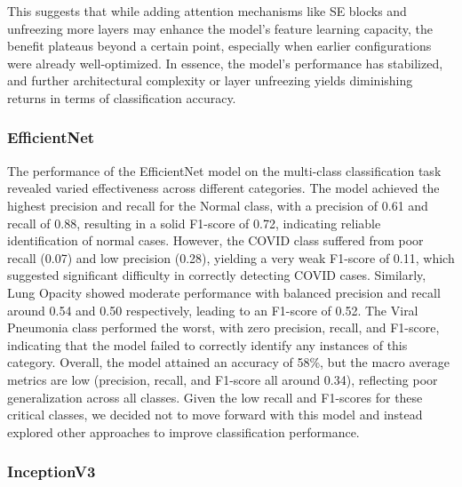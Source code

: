 \documentclass{article}
\begin{document}
This suggests that while adding attention mechanisms like SE blocks and unfreezing more layers may enhance the model’s feature learning capacity, the benefit plateaus beyond a certain point, especially when earlier configurations were already well-optimized. In essence, the model’s performance has stabilized, and further architectural complexity or layer unfreezing yields diminishing returns in terms of classification accuracy.

\subsubsection{EfficientNet}

The performance of the EfficientNet model on the multi-class classification task revealed varied effectiveness across different categories. The model achieved the highest precision and recall for the Normal class, with a precision of 0.61 and recall of 0.88, resulting in a solid F1-score of 0.72, indicating reliable identification of normal cases. However, the COVID class suffered from poor recall (0.07) and low precision (0.28), yielding a very weak F1-score of 0.11, which suggested significant difficulty in correctly detecting COVID cases. Similarly, Lung Opacity showed moderate performance with balanced precision and recall around 0.54 and 0.50 respectively, leading to an F1-score of 0.52. The Viral Pneumonia class performed the worst, with zero precision, recall, and F1-score, indicating that the model failed to correctly identify any instances of this category. Overall, the model attained an accuracy of 58\%, but the macro average metrics are low (precision, recall, and F1-score all around 0.34), reflecting poor generalization across all classes. Given the low recall and F1-scores for these critical classes, we decided not to move forward with this model and instead explored other approaches to improve classification performance.

\subsubsection{InceptionV3}
\end{document}

